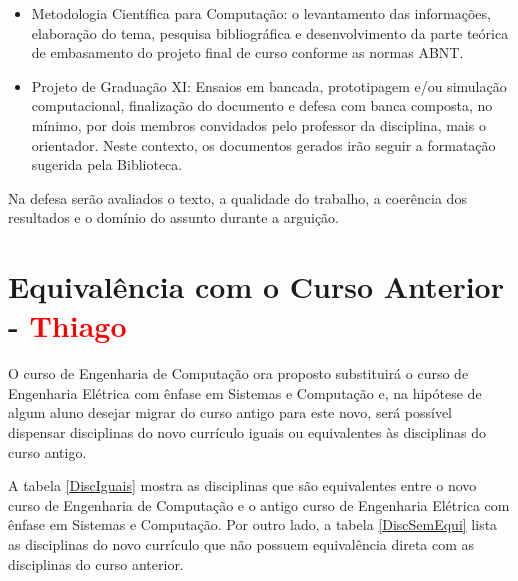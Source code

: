 \begin{itemize}
\item Metodologia Científica para Computação: o levantamento das informações, elaboração do tema, pesquisa bibliográfica e desenvolvimento da parte teórica de embasamento do projeto final de curso conforme as normas ABNT.
\item Projeto de Graduação XI: Ensaios em bancada, prototipagem e/ou simulação computacional, finalização do documento e defesa com banca composta, no mínimo, por dois membros convidados pelo professor da disciplina, mais o orientador.
Neste contexto, os documentos gerados irão seguir a formatação sugerida pela Biblioteca.
\end{itemize}

Na defesa serão avaliados o texto, a qualidade do trabalho, a coerência dos resultados e o domínio do assunto durante a arguição.


\section{Equivalência com o Curso Anterior - \textcolor{red}{Thiago}}

O curso de Engenharia de Computação ora proposto substituirá o curso de Engenharia Elétrica com ênfase em Sistemas e Computação e, na hipótese de algum aluno desejar migrar do curso antigo para este novo, será possível dispensar disciplinas do novo currículo iguais ou equivalentes às disciplinas do curso antigo.

A tabela \ref{DiscIguais} mostra as disciplinas que são equivalentes entre o novo curso de Engenharia de Computação e o antigo curso de Engenharia Elétrica com ênfase em Sistemas e Computação. Por outro lado, a tabela \ref{DiscSemEqui} lista as disciplinas do novo currículo que não possuem equivalência direta com as disciplinas do curso anterior.

